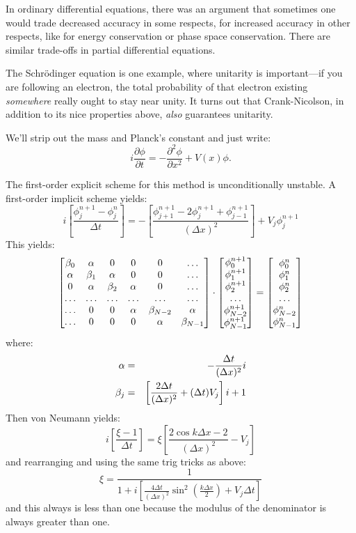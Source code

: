 In ordinary differential equations, there was an argument that
sometimes one would trade decreased accuracy in some respects, for
increased accuracy in other respects, like for energy conservation or
phase space conservation. There are similar trade-offs in partial
differential equations.

The Schr\"odinger equation is one example, where unitarity is
important---if you are following an electron, the total probability of
that electron existing {\it somewhere} really ought to stay near
unity.  It turns out that Crank-Nicolson, in addition to its nice
properties above, {\it also} guarantees unitarity.

We'll strip out the mass and Planck's constant and just write:
\begin{equation}
 i \frac{\partial\phi}{\partial t} = - \frac{\partial^2 \phi}{\partial x^2}
+ V(x)\phi.
\end{equation}

The first-order explicit scheme for this method is unconditionally
unstable. A first-order implicit scheme yields:
\begin{equation}
i \left[\frac{\phi_j^{n+1} - \phi_j^n}{\Delta t}\right]
= - \left[\frac{\phi_{j+1}^{n+1} - 2 \phi_{j}^{n+1}
+ \phi_{j-1}^{n+1}}{\left(\Delta x\right)^2} \right] +
V_j \phi_j^{n+1}
\end{equation}
This yields:
\begin{equation}
\left[
\begin{matrix}
\beta_0 & \alpha & 0 & 0 & 0 & \ldots\cr
\alpha & \beta_1 & \alpha & 0 & 0 &\ldots\cr
0 & \alpha & \beta_2 & \alpha & 0 & \ldots\cr
\ldots & \ldots & \ldots & \ldots & \ldots & \ldots \cr
\ldots & 0 & 0 & \alpha & \beta_{N-2} & \alpha \cr
\ldots & 0 & 0 & 0 & \alpha & \beta_{N-1} \cr
\end{matrix}
\right] \cdot
\left[
\begin{matrix}
\phi_0^{n+1} \cr
\phi_1^{n+1} \cr
\phi_2^{n+1} \cr
\ldots \cr
\phi_{N-2}^{n+1} \cr
\phi_{N-1}^{n+1} \cr
\end{matrix}\right]
 =
\left[
\begin{matrix}
\phi_0^{n} \cr
\phi_1^{n} \cr
\phi_2^{n} \cr
\ldots \cr
\phi_{N-2}^{n} \cr
\phi_{N-1}^{n} \cr
\end{matrix}\right]
\end{equation}
where:
\begin{eqnarray}
\alpha &=& - \frac{\Delta t}{(\Delta x)^2} i \cr
\beta_j &=& \left[\frac{2 \Delta t}{(\Delta x)^2} + (\Delta t) V_j\right] i + 1
\end{eqnarray}
Then von Neumann yields:
\begin{equation}
i \left[\frac{\xi - 1}{\Delta t}\right] =
\xi \left[ \frac{2 \cos k \Delta x - 2}{(\Delta x)^2} - V_j \right] 
\end{equation}
and rearranging and using the same trig tricks as above:
\begin{equation}
\xi = \frac{1}{1 + i \left[\frac{4 \Delta t}{(\Delta
x)^2} \sin^2\left(\frac{k \Delta x}{2}\right)+ V_j \Delta t\right]}
\end{equation}
and this always is less than one because the modulus of the
denominator is always greater than one.

